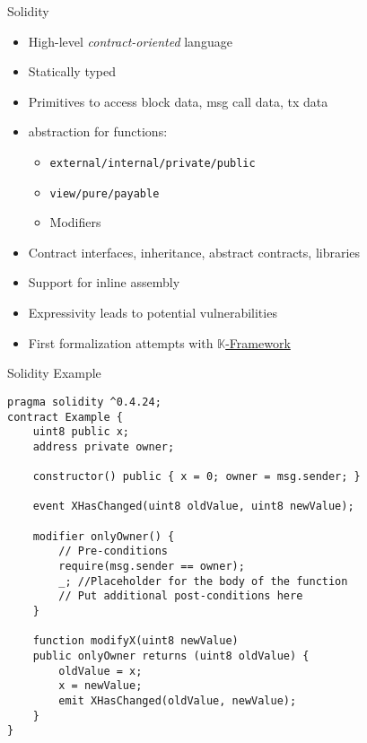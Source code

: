\begin{frame}[fragile]{Solidity}
\begin{itemize}
\item High-level \emph{contract-oriented} language 
\item Statically typed
\item Primitives to access block data, msg call data, tx data %
\item abstraction for functions:
\begin{itemize}
\item \texttt{external/internal/private/public}
\item \texttt{view/pure/payable}
\item Modifiers
\end{itemize}
\item Contract interfaces, inheritance, abstract contracts, libraries
\item Support for inline assembly
\item Expressivity leads to potential vulnerabilities
\item First formalization attempts with \href{https://github.com/kframework/solidity-semantics}{$\mathbb{K}$-Framework}
\end{itemize}
\end{frame}

\begin{frame}[fragile]{Solidity Example}
\begin{lstlisting}[frame=single, language=Solidity]
pragma solidity ^0.4.24;
contract Example {
    uint8 public x; 
    address private owner;
    
    constructor() public { x = 0; owner = msg.sender; }
    
    event XHasChanged(uint8 oldValue, uint8 newValue);
    
    modifier onlyOwner() {
    	// Pre-conditions
        require(msg.sender == owner);
        _; //Placeholder for the body of the function
        // Put additional post-conditions here
    }
    
    function modifyX(uint8 newValue) 
    public onlyOwner returns (uint8 oldValue) {
        oldValue = x;
        x = newValue;
        emit XHasChanged(oldValue, newValue);
    }
}


\end{lstlisting}

\end{frame}


